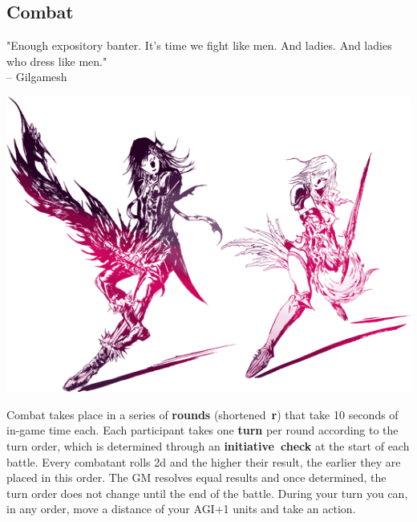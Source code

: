\subsection*{\hypertarget{combat}{Combat}}
%
"Enough expository banter. It's time we fight like men. And ladies. And ladies who dress like men."\\
\indent -- Gilgamesh 
%
\begin{center} \includegraphics[width=1\columnwidth]{./art/images/ff13-2.png} \end{center}
%
\vspace{0.5cm}
%
Combat takes place in a series of \textbf{rounds} (shortened~\textbf{r}) that take 10 seconds of in-game time each.
Each participant takes one \textbf{turn} per round according to the turn order, which is determined  
through an \mbox{\textbf{initiative check}} at the start of each battle.
Every combatant rolls 2d and the higher their result, the earlier they are placed in this order.
The GM resolves equal results and once determined, the turn order does not change until the end of the battle.
During your turn you can, in any order, move a distance of your AGI+1 units and take an action.
%
\vfill
%
